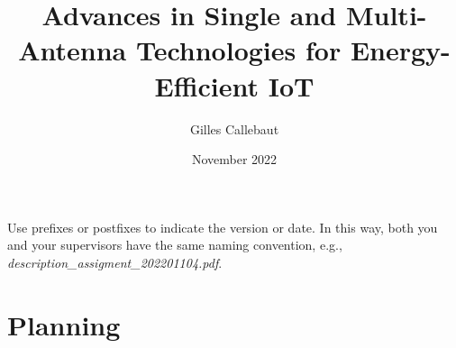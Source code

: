 \documentclass{article}
\title{Advances in Single and Multi-Antenna Technologies for Energy-Efficient IoT}
\author{Gilles Callebaut}
\date{November 2022}
\begin{document}
\maketitle

\section*{}

Use prefixes or postfixes to indicate the version or date. In this way, both you and your supervisors have the same naming convention, e.g., \textit{description\_assigment\_202201104.pdf}.

\lipsum[1-1]

\section*{}
\lipsum[3-3]

\section*{Planning}
\lipsum[4-4]
\end{document}
